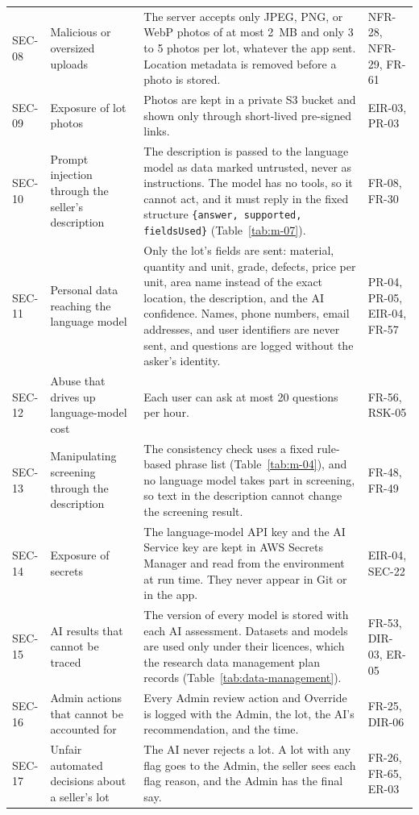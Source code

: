 {\begin{longtable}{@{}>{\raggedright\arraybackslash}p{}>{\raggedright\arraybackslash}p{}>{\raggedright\arraybackslash}p{}>{\raggedright\arraybackslash}p{}@{}}
SEC-08 & Malicious or oversized uploads & The server accepts only JPEG, PNG, or WebP photos of at most 2~MB and only 3 to 5 photos per lot, whatever the app sent. Location metadata is removed before a photo is stored. & NFR-28, NFR-29, FR-61 \\
SEC-09 & Exposure of lot photos & Photos are kept in a private S3 bucket and shown only through short-lived pre-signed links. & EIR-03, PR-03 \\
SEC-10 & Prompt injection through the seller's description & The description is passed to the language model as data marked untrusted, never as instructions. The model has no tools, so it cannot act, and it must reply in the fixed structure \texttt{\{answer, supported, fieldsUsed\}} (Table~\ref{tab:m-07}). & FR-08, FR-30 \\
SEC-11 & Personal data reaching the language model & Only the lot's fields are sent: material, quantity and unit, grade, defects, price per unit, area name instead of the exact location, the description, and the AI confidence. Names, phone numbers, email addresses, and user identifiers are never sent, and questions are logged without the asker's identity. & PR-04, PR-05, EIR-04, FR-57 \\
SEC-12 & Abuse that drives up language-model cost & Each user can ask at most 20 questions per hour. & FR-56, RSK-05 \\
SEC-13 & Manipulating screening through the description & The consistency check uses a fixed rule-based phrase list (Table~\ref{tab:m-04}), and no language model takes part in screening, so text in the description cannot change the screening result. & FR-48, FR-49 \\
SEC-14 & Exposure of secrets & The language-model API key and the AI Service key are kept in AWS Secrets Manager and read from the environment at run time. They never appear in Git or in the app. & EIR-04, SEC-22 \\
SEC-15 & AI results that cannot be traced & The version of every model is stored with each AI assessment. Datasets and models are used only under their licences, which the research data management plan records (Table~\ref{tab:data-management}). & FR-53, DIR-03, ER-05 \\
SEC-16 & Admin actions that cannot be accounted for & Every Admin review action and Override is logged with the Admin, the lot, the AI's recommendation, and the time. & FR-25, DIR-06 \\
SEC-17 & Unfair automated decisions about a seller's lot & The AI never rejects a lot. A lot with any flag goes to the Admin, the seller sees each flag reason, and the Admin has the final say. & FR-26, FR-65, ER-03 \\

\end{longtable}}
